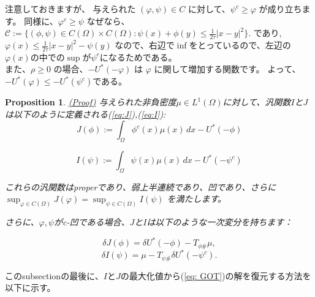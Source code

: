 \documentclass{jsarticle}
\newtheorem{prop}{Proposition}[section]
\theoremstyle{definition}
\begin{document}
注意しておきますが、
{\color{teal}
与えられた \((\varphi, \psi) \in C\) に対して、{\color{red}\(\psi^c \geq \varphi\) }が成り立ちます。
}
同様に、\(\varphi^c \geq \psi\) 
なぜなら、
$
    \mathcal{C}  := \{(\phi, \psi) \in C(\Omega) \times C(\Omega) : \psi(x) + \phi(y) \leq \frac{1}{2 \tau} |x - y|^2 \}. 
$
であり,
$
  \varphi(x) \le \frac{1}{2\tau}|x-y|^2 - \psi(y)
$
なので、右辺で$\inf$をとっているので、左辺の$\varphi(x)$の中での$\sup$が$\psi^c$になるためである。\\

また、\(\rho \geq 0\) の場合、\(- U^*(-\varphi)\) は \(\varphi\) に関して増加する関数です。
よって、{\color{red}$-U^*(\varphi) \le -U^*(\psi^c)$}である。

\begin{prop}
    \label{prop:functional}
    \hyperlink{proof:prop:functional}{(Proof)}
    与えられた非負密度$\mu \in L^1(\Omega)$に対して、汎関数$I$と$J$は以下のように定義される(\ref{eq:J}),(\ref{eq:I}):
    \begin{equation}
        J(\phi):= \int_{\Omega} \phi^c(x) \mu(x) \,dx - U^*(- \phi)
    \end{equation}
    
    \begin{equation}
        I(\psi):= \int_{\Omega} \psi(x)\mu(x) \, dx - U^*(- \psi^{c})
    \end{equation}

    これらの汎関数はproperであり、弱上半連続であり、凹であり、さらに $\sup_{\varphi\in C(\Omega)} J(\varphi) = \sup_{\psi\in C(\Omega)} I(\psi)$ を満たします。
    {\color{teal}
    さらに、$\varphi, \psi$がc-凹である場合、$J$と$I$は以下のような一次変分を持ちます：

    \begin{equation}
        \label{eq:delta J}
        \delta J(\phi) = \delta U^*(- \phi) - T_{\phi \#} \mu,
    \end{equation}
    \begin{equation}
        \label{eq:delta I}
        \delta I(\psi) = \mu - T_{\psi \#} \delta U^* (- \psi^c).
    \end{equation}
    }
\end{prop}

このsubsectionの最後に、$I$と$J$の最大化値から(\ref{eq: GOT})の解を復元する方法を以下に示す。
\end{document}
